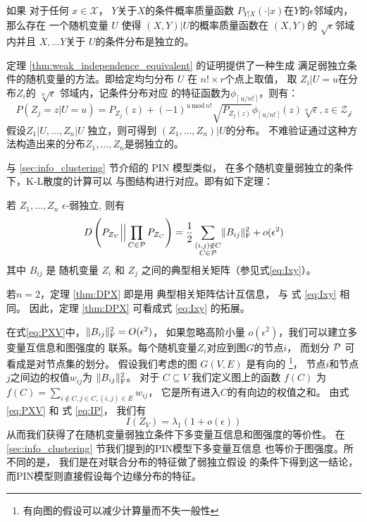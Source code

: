 \begin{theorem}\label{thm:weak_independence_equivalent}
  如果 对于任何 $x \in \mathcal{X}$，
$Y$关于$X$的条件概率质量函数
$P_{Y|X}(\cdot |x)$在$Y$的$\epsilon$邻域内，那么存在
一个随机变量 $U$
  使得
  $(X, Y)|U$的概率质量函数在 $(X, Y)$的
  $\sqrt{\epsilon}$邻域内并且
  $X, \dots Y$关于
  $U$的条件分布是独立的。
\end{theorem}
  定理 \ref{thm:weak_independence_equivalent} 的证明提供了一种生成
  满足弱独立条件的随机变量的方法。即给定均匀分布
  $U$ 在 $n! \times r$个点上取值，
  取 $Z_i|U=u$在分布$Z_i$的
  $\sqrt[n]{\epsilon}$ 邻域内，记条件分布对应
  的特征函数为$\phi_{\lceil\, u/n!\, \rceil}$，则有：
  \begin{equation}
    P(Z_j=z|U=u) = P_{Z_j}(z) + 
    (-1)^{u \,\mathrm{mod}\, n!}\sqrt{P_{Z_j(z)}}
    \phi_{\lceil\, u/n!\, \rceil}(z) \sqrt[n]{\epsilon}, z \in \mathcal{Z_j}
  \end{equation}
  假设$Z_1|U, \dots, Z_n|U$ 独立，则可得到
  $(Z_1, \dots, Z_n)|U$的分布。
  不难验证通过这种方法构造出来的分布$Z_1, \dots, Z_n$是弱独立的。

与 \ref{sec:info_clustering} 节介绍的 PIN 模型类似，
在多个随机变量弱独立的条件下，K-L散度的计算可以
与图结构进行对应。即有如下定理：
\begin{theorem}\label{thm:DPX}
若 $Z_1, \dots, Z_n$ $\epsilon$-弱独立, 则有
\begin{equation}\label{eq:PXV}
D\left(P_{Z_V} \Big|\Big| \prod_{C\in \P} P_{Z_C} \right)
= {1 \over 2}
\sum_{\substack{(i,j) \not\in C\\ C\in \P}} \norm{B_{ij}}_{\mathrm{F}}^2 + o(\epsilon^2)
\end{equation}
其中 $B_{ij}$ 是 随机变量  $Z_i$ 和 $Z_j$
之间的典型相关矩阵（参见式\eqref{eq:Ixy}）。
\end{theorem}
若$ n = 2$，定理 \ref{thm:DPX} 即是用 典型相关矩阵估计互信息，
与 式 \eqref{eq:Ixy} 相同。
因此，定理 \ref{thm:DPX} 可看成式 \eqref{eq:Ixy} 
的拓展。

在式\eqref{eq:PXV}中，$\norm{B_{ij}}_{\mathrm{F}}^2 =O(\epsilon^2)$，
如果忽略高阶小量 $o(\epsilon^2)$，我们可以建立多变量互信息和图强度的
联系。每个随机变量$Z_i$对应到图$G$的节点$i$，
而划分 $\P$
可看成是对节点集的划分。
假设我们考虑的图 $G(V, E)$ 是有向的
\footnote{有向图的假设可以减少计算量而不失一般性}，
节点$i$和节点$j$之间边的权值$w_{ij}$为
$\norm{B_{ij}}_{\mathrm{F}}^2$。
对于 $C\subseteq V$
我们定义图上的函数 $f(C)$ 
 为 $f(C) = \sum_{i\not\in C, j\in C, (i,j) \in E} w_{ij}$，
它是所有进入$C$的有向边的权值之和。
由式\eqref{eq:PXV}
和 式 \eqref{eq:IP}，
我们有
\begin{equation}\label{eq:PXV_Data_Simplified}
I(Z_V) = \lambda_1 (1 + o(\epsilon))
\end{equation}
从而我们获得了在随机变量弱独立条件下多变量互信息和图强度的等价性。
在 \ref{sec:info_clustering} 节我们提到的PIN模型下多变量互信息
也等价于图强度。所不同的是，
我们是在对联合分布的特征做了弱独立假设
的条件下得到这一结论，而PIN模型则直接假设每个边缘分布的特征。

